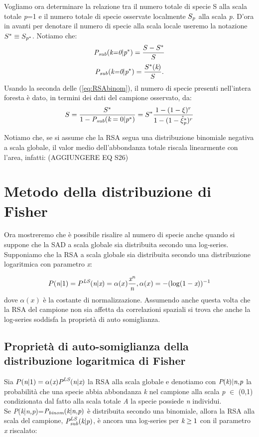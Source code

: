 Vogliamo ora determinare la relazione tra il numero totale di specie S alla scala totale \emph{p}=1 e il numero totale di specie osservate localmente $S_\emph{p}$ alla scala \emph{p}.
D'ora in avanti per denotare il numero di specie alla scala locale useremo la notazione $S^*\equiv S_{\emph{p}^*}$.
Notiamo che:
\begin{equation}
\emph{P}_\emph{sub}(\emph{k=0}|\emph{p}^*)=\frac{S-S^*}{S}
\end{equation}
\begin{equation}
    \emph{P}_\emph{sub}(\emph{k=0}|\emph{p}^*)=\frac{S^*(\emph{k})}{S}.
\end{equation}
Usando la seconda delle (\ref{eq:RSAbinom}), il numero di specie presenti nell'intera foresta è dato, in termini dei dati del campione osservato, da:
\begin{equation}
S=\frac{S^*}{1-\emph{P}_\emph{sub}(\emph{k}=0|\emph{p}^*)}=S^*\frac{1-(1-\xi)^r}{1-(1-\hat \xi_{\emph{p}}^*)^r}
\label{eq:upscaleNB}
\end{equation}

Notiamo che, se si assume che la RSA segua una distribuzione binomiale negativa a scala globale, il valor medio dell'abbondanza totale riscala linearmente con l'area, infatti:
(AGGIUNGERE EQ S26)

\section{Metodo della distribuzione di Fisher}
Ora mostreremo che è possibile risalire al numero di specie anche quando si suppone che la SAD a scala globale sia distribuita secondo una log-series.\\
Supponiamo che la RSA a scala globale sia distribuita secondo una distribuzione logaritmica con parametro \emph{x}:

\begin{equation}
P(\emph{n}|1)=P^{\emph{LS}}(\emph{n}|\emph{x})=\alpha(x)\frac{\emph{x}^\emph{n}}{\emph{n}}, \alpha(x)=-(\log(1-\emph{x}))^{-1}
\end{equation}
dove $\alpha(x)$ è la costante di normalizzazione.
Assumendo anche questa volta che la RSA del campione non sia affetta da correlazioni spaziali si trova che anche la log-series soddisfa la proprietà di auto somiglianza.

\subsection{Proprietà di auto-somiglianza della distribuzione logaritmica di Fisher}
Sia $P(\emph{n}|1)=\alpha(\emph{x})\emph{P}^{\emph{LS}}(\emph{n}|\emph{x})$ la RSA alla scala globale e denotiamo con $\emph{P}(\emph{k})|\emph{n,p}$ la probabilità che una specie abbia abbondanza \emph{k} nel campione alla scala \emph{p} $\in$ (0,1) condizionata dal fatto  alla scala totale \emph{A} la specie possiede \emph{n} individui.\\
Se \emph{P}(\emph{k}|\emph{n,p})=$\emph{P}_\emph{binom}(\emph{k}|\emph{n,p})$ è distribuita secondo una binomiale, allora la RSA alla scala del campione, $\emph{P}^\emph{LS}_\emph{sub}(\emph{k}|\emph{p})$, è ancora una log-series per $\emph{k}\ge 1$ con il parametro \emph{x} riscalato:


